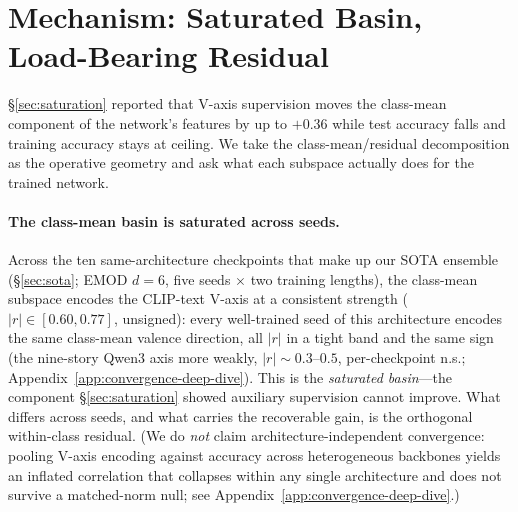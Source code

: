 \section{Mechanism: Saturated Basin, Load-Bearing Residual}
\label{sec:convergence}

\S\ref{sec:saturation} reported that V-axis supervision moves the
class-mean component of the network's features by up to $+0.36$ while
test accuracy falls and training accuracy stays at ceiling. We take
the class-mean/residual decomposition as the operative geometry and
ask what each subspace actually does for the trained network.

\paragraph{The class-mean basin is saturated across seeds.}
Across the ten same-architecture checkpoints that make up our SOTA
ensemble (\S\ref{sec:sota}; EMOD $d{=}6$, five seeds $\times$ two
training lengths), the class-mean subspace encodes the CLIP-text V-axis at a
consistent strength ($|r|\in[0.60, 0.77]$, unsigned): every
well-trained seed of this architecture encodes the same class-mean
valence direction, all $|r|$ in a tight band and the same sign (the
nine-story Qwen3 axis more weakly, $|r|\sim0.3$--$0.5$, per-checkpoint
n.s.; Appendix~\ref{app:convergence-deep-dive}). This is the \emph{saturated
basin}---the component \S\ref{sec:saturation} showed auxiliary
supervision cannot improve. What differs across seeds, and what
carries the recoverable gain, is the orthogonal within-class residual.
(We do \emph{not} claim architecture-independent convergence: pooling
V-axis encoding against accuracy across heterogeneous backbones yields
an inflated correlation that collapses within any single architecture
and does not survive a matched-norm null; see
Appendix~\ref{app:convergence-deep-dive}.)

